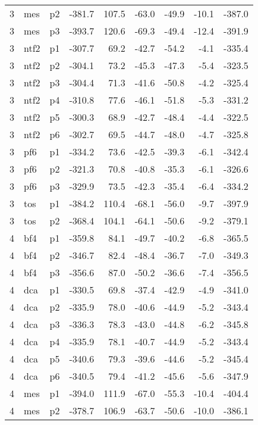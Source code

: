 \documentclass[a4paper]{article}
\begin{document}
\begin{table}[ht]
\begin{tabular}{rllrrrrrr}
   3 & mes & p2 & -381.7 & 107.5 & -63.0 & -49.9 & -10.1 & -387.0 \\ 
   3 & mes & p3 & -393.7 & 120.6 & -69.3 & -49.4 & -12.4 & -391.9 \\ 
   3 & ntf2 & p1 & -307.7 & 69.2 & -42.7 & -54.2 & -4.1 & -335.4 \\ 
   3 & ntf2 & p2 & -304.1 & 73.2 & -45.3 & -47.3 & -5.4 & -323.5 \\ 
   3 & ntf2 & p3 & -304.4 & 71.3 & -41.6 & -50.8 & -4.2 & -325.4 \\ 
   3 & ntf2 & p4 & -310.8 & 77.6 & -46.1 & -51.8 & -5.3 & -331.2 \\ 
   3 & ntf2 & p5 & -300.3 & 68.9 & -42.7 & -48.4 & -4.4 & -322.5 \\ 
   3 & ntf2 & p6 & -302.7 & 69.5 & -44.7 & -48.0 & -4.7 & -325.8 \\ 
   3 & pf6 & p1 & -334.2 & 73.6 & -42.5 & -39.3 & -6.1 & -342.4 \\ 
   3 & pf6 & p2 & -321.3 & 70.8 & -40.8 & -35.3 & -6.1 & -326.6 \\ 
   3 & pf6 & p3 & -329.9 & 73.5 & -42.3 & -35.4 & -6.4 & -334.2 \\ 
   3 & tos & p1 & -384.2 & 110.4 & -68.1 & -56.0 & -9.7 & -397.9 \\ 
   3 & tos & p2 & -368.4 & 104.1 & -64.1 & -50.6 & -9.2 & -379.1 \\ 
   4 & bf4 & p1 & -359.8 & 84.1 & -49.7 & -40.2 & -6.8 & -365.5 \\ 
   4 & bf4 & p2 & -346.7 & 82.4 & -48.4 & -36.7 & -7.0 & -349.3 \\ 
   4 & bf4 & p3 & -356.6 & 87.0 & -50.2 & -36.6 & -7.4 & -356.5 \\ 
   4 & dca & p1 & -330.5 & 69.8 & -37.4 & -42.9 & -4.9 & -341.0 \\ 
   4 & dca & p2 & -335.9 & 78.0 & -40.6 & -44.9 & -5.2 & -343.4 \\ 
   4 & dca & p3 & -336.3 & 78.3 & -43.0 & -44.8 & -6.2 & -345.8 \\ 
   4 & dca & p4 & -335.9 & 78.1 & -40.7 & -44.9 & -5.2 & -343.4 \\ 
   4 & dca & p5 & -340.6 & 79.3 & -39.6 & -44.6 & -5.2 & -345.4 \\ 
   4 & dca & p6 & -340.5 & 79.4 & -41.2 & -45.6 & -5.6 & -347.9 \\ 
   4 & mes & p1 & -394.0 & 111.9 & -67.0 & -55.3 & -10.4 & -404.4 \\ 
   4 & mes & p2 & -378.7 & 106.9 & -63.7 & -50.6 & -10.0 & -386.1 \\ 

\end{tabular}
\end{table}
\end{document}
